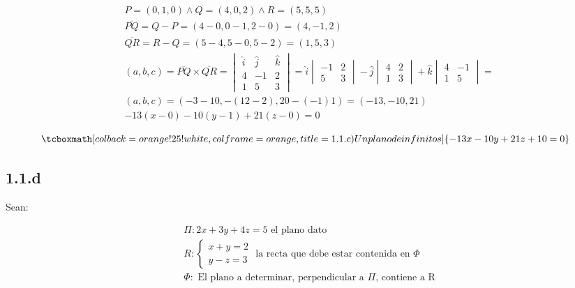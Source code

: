 \documentclass{article}
\begin{document}
\begin{subequations}
\begin{align}
& P = (0, 1, 0) \wedge Q = (4, 0, 2) \wedge R = (5, 5, 5) \\
& \overline{PQ} = Q - P = (4-0, 0-1, 2-0) = (4, -1, 2) \\
& \overline{QR} = R - Q = (5-4, 5-0, 5-2) = (1, 5, 3) \\
& (a, b, c) = \overline{PQ} \times \overline{QR} = \begin{vmatrix}
\hat{i} & \hat{j} & \hat{k} \\
4 & -1 & 2 \\
1 & 5 & 3
\end{vmatrix} = \hat{i} \begin{vmatrix}
-1 & 2 \\
5 & 3
\end{vmatrix} -\hat{j} \begin{vmatrix}
4 & 2 \\
1 & 3
\end{vmatrix} +\hat{k} \begin{vmatrix}
4 & -1 \\
1 & 5
\end{vmatrix} = \\
& (a, b, c) = (-3-10, -(12-2), 20-(-1)1) = (-13, -10, 21) \\
& -13 (x-0) -10 (y-1) +21 (z-0) = 0
\end{align}
\end{subequations}

\begin{equation}
\tcboxmath[colback=orange!25!white,colframe=orange,title=1.1.c) Un plano de infinitos]
{ -13x - 10y + 21z + 10 = 0 }
\end{equation}

\subsection*{1.1.d}
\label{subsec:1.1.d}

Sean:

\begin{subequations}
\begin{align}
& \Pi: 2x + 3y + 4z = 5 \text{ el plano dato} \\
& R: \left\{ \begin{array}{ll}
x + y = 2 \\
y - z = 3
\end{array} \right. \text{ la recta que debe estar contenida en } \Phi \\
& \Phi: \text{ El plano a determinar, perpendicular a } \Pi \text{, contiene a R}
\end{align}
\end{subequations}
\end{document}

